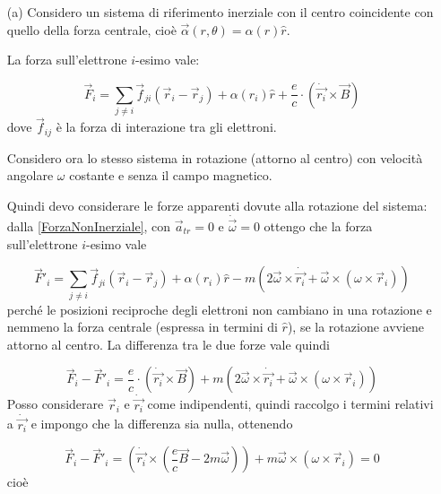\documentclass[../main.tex]{subfiles}
\begin{document}
  \solution
  \begin{itemize}
    \item[(a)]
    Considero un sistema di riferimento inerziale con il centro coincidente con quello della forza centrale, cio\`e $\vec \alpha(r, \theta)=\alpha(r)\hat r$.
    
    La forza sull'elettrone $i$-esimo vale:
    
    \begin{equation}
      \label{ecm:forzai}
      \vec F_i= \sum_{j \neq i} \vec f_{ji}(\vec r_i-\vec r_j)+\alpha(r_i)\hat r+\frac{e}{c} \cdot \left(\dot {\vec {r_i}} \times \vec B\right)
    \end{equation}
    dove $\vec f_{ij}$ \`e la forza di interazione tra gli elettroni.
    
    Considero ora lo stesso sistema in rotazione (attorno al centro) con velocit\`a angolare $\omega$ costante e senza il campo magnetico.
    
    Quindi devo considerare le forze apparenti dovute alla rotazione del sistema: dalla \cref{ForzaNonInerziale}, con $\vec a_{tr}=0$ e $\dot{\vec \omega}=0$ ottengo che la forza sull'elettrone $i$-esimo vale 
    
    \begin{equation}
      \label{ecm:forzar}
      \vec F'_i= \sum_{j \neq i} \vec f_{ji}(\vec r_i-\vec r_j)+\alpha(r_i)\hat r-m (2 \vec \omega \times \dot {\vec {r_i}}+ \vec \omega \times (\omega \times \vec r_i))
    \end{equation}
    perch\'e le posizioni reciproche degli elettroni non cambiano in una rotazione e nemmeno la forza centrale (espressa in termini di $\hat r$), se la rotazione avviene attorno al centro. \newline
    La differenza tra le due forze vale quindi
    
    \begin{equation}
      \label{ecm:diff}
      \vec F_i-\vec F'_i=\frac{e}{c} \cdot \left(\dot {\vec {r_i}} \times \vec B\right)+m (2 \vec \omega \times \dot {\vec {r_i}}+ \vec \omega \times (\omega \times \vec r_i))
    \end{equation}
    Posso considerare $\vec r_i$ e $\dot {\vec{r_i}}$ come indipendenti, quindi raccolgo i termini relativi a $\dot {\vec{r_i}}$ e impongo che la differenza sia nulla, ottenendo
      
    \begin{equation}
      \label{ecm:diff0}
      \vec F_i-\vec F'_i=\left(\dot {\vec {r_i}} \times \left(\frac{e}{c} \vec B -2m\vec \omega\right)\right)+ m \vec \omega \times (\omega \times \vec r_i)=0
    \end{equation}
    cio\`e
    

\end{itemize}
\end{document}
